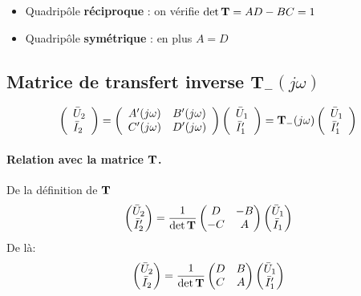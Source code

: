 \begin{itemize}
	\item Quadripôle \textbf{réciproque} : on vérifie $\text{det}\, {\bf T}=AD-BC=1$
	\item Quadripôle \textbf{symétrique} : en plus $A=D$
\end{itemize}



\subsection{Matrice de transfert inverse $\mathbf{T}_-(j\omega)$}%
\[
\left(
\begin{array}{l}
\bar{U}_2\\
\bar{I}_2
\end{array} \right)
= \left(
\begin{array}{cc}
A'(j\omega) & B'(j\omega)\\
C'(j\omega)  &D'(j\omega)
\end{array} \right)\left(
\begin{array}{l}
\bar{U}_1\\
\bar{I}'_1
\end{array} \right)={\bf T}_{-}(j\omega)
\left(
\begin{array}{l}
\bar{U}_1\\
\bar{I}'_1
\end{array} \right)
\]

\begin{center}
\end{center}



\paragraph{Relation avec la matrice ${\bf T}$.}%


De la définition de ${\bf T}$
\[
\begin{pmatrix}
\bar{U}_2\\
\bar{I}_2'
\end{pmatrix} = \frac{1}{\text{det}\, {\bf T}}
\begin{pmatrix}
D & -B\\
-C & A
\end{pmatrix}
\begin{pmatrix}
\bar{U}_1\\\bar{I}_1
\end{pmatrix}\]
De là:
\[
\begin{pmatrix}
\bar{U}_2\\
\bar{I}_2
\end{pmatrix} = \frac{1}{\text{det}\, {\bf T}}
\begin{pmatrix}
D & B\\
C & A
\end{pmatrix}
\begin{pmatrix}
\bar{U}_1\\\bar{I}_1'
\end{pmatrix}\]


